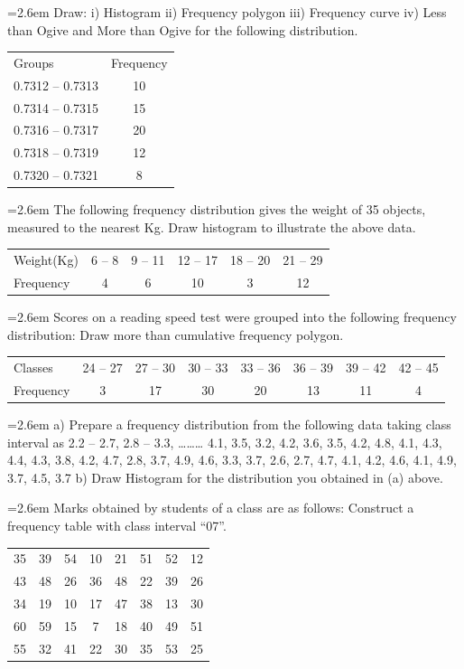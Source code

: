 \documentclass[11pt,a4paper]{article}
\newcommand{\Q}[2]{\par\smallskip\noindent\hangindent=2.6em\hangafter=1
  \makebox[2.6em][l]{\textbf{#1.}}#2\par}
\newcommand{\dtab}[2]{\par\smallskip\noindent\hspace*{2.6em}\begin{tabular}{#1}\hline #2\\ \hline\end{tabular}\par\smallskip}
\begin{document}
\Q{27}{Draw: i) Histogram ii) Frequency polygon iii) Frequency curve iv) Less than Ogive and More than Ogive for the following distribution.\dtab{|l@{\hspace{4em}}c|}{Groups & Frequency \\ 0.7312 -- 0.7313 & 10 \\ 0.7314 -- 0.7315 & 15 \\ 0.7316 -- 0.7317 & 20 \\ 0.7318 -- 0.7319 & 12 \\ 0.7320 -- 0.7321 & 8}}
\Q{28}{The following frequency distribution gives the weight of 35 objects, measured to the nearest Kg. Draw histogram to illustrate the above data.\dtab{|l@{\hspace{2em}}c@{\hspace{2em}}c@{\hspace{2em}}c@{\hspace{2em}}c@{\hspace{2em}}c|}{Weight(Kg) & 6 -- 8 & 9 -- 11 & 12 -- 17 & 18 -- 20 & 21 -- 29 \\ Frequency & 4 & 6 & 10 & 3 & 12}}
\Q{29}{Scores on a reading speed test were grouped into the following frequency distribution: Draw more than cumulative frequency polygon.\dtab{|l@{\hspace{1.5em}}c@{\hspace{1.5em}}c@{\hspace{1.5em}}c@{\hspace{1.5em}}c@{\hspace{1.5em}}c@{\hspace{1.5em}}c@{\hspace{1.5em}}c|}{Classes & 24 -- 27 & 27 -- 30 & 30 -- 33 & 33 -- 36 & 36 -- 39 & 39 -- 42 & 42 -- 45 \\ Frequency & 3 & 17 & 30 & 20 & 13 & 11 & 4}}
\Q{30}{a) Prepare a frequency distribution from the following data taking class interval as 2.2  --  2.7, 2.8  --  3.3, ……… 4.1, 3.5, 3.2, 4.2, 3.6, 3.5, 4.2, 4.8, 4.1, 4.3, 4.4, 4.3, 3.8, 4.2, 4.7, 2.8, 3.7, 4.9, 4.6, 3.3, 3.7, 2.6, 2.7, 4.7, 4.1, 4.2, 4.6, 4.1, 4.9, 3.7, 4.5, 3.7 b) Draw Histogram for the distribution you obtained in (a) above.}
\Q{31}{Marks obtained by students of a class are as follows: Construct a frequency table with class interval ``07''.\dtab{|c@{\hspace{1.5em}}c@{\hspace{1.5em}}c@{\hspace{1.5em}}c@{\hspace{1.5em}}c@{\hspace{1.5em}}c@{\hspace{1.5em}}c@{\hspace{1.5em}}c|}{35 & 39 & 54 & 10 & 21 & 51 & 52 & 12 \\ 43 & 48 & 26 & 36 & 48 & 22 & 39 & 26 \\ 34 & 19 & 10 & 17 & 47 & 38 & 13 & 30 \\ 60 & 59 & 15 & 7 & 18 & 40 & 49 & 51 \\ 55 & 32 & 41 & 22 & 30 & 35 & 53 & 25}}
\end{document}
